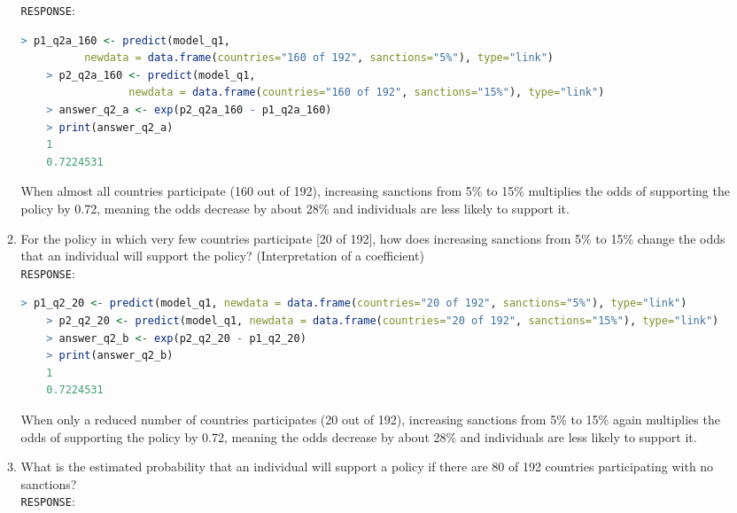 \documentclass[12pt,letterpaper]{article}
\begin{document}
\begin{enumerate}
\begin{enumerate}
\texttt{RESPONSE}:\\

\begin{lstlisting}[language=R]
	> p1_q2a_160 <- predict(model_q1,
	      newdata = data.frame(countries="160 of 192", sanctions="5%"), type="link")
	> p2_q2a_160 <- predict(model_q1,
	             newdata = data.frame(countries="160 of 192", sanctions="15%"), type="link")
	> answer_q2_a <- exp(p2_q2a_160 - p1_q2a_160)
	> print(answer_q2_a)
	1 
	0.7224531 \end{lstlisting}
\vspace{0.2in}

When almost all countries participate (160 out of 192), increasing sanctions from 5\% to 15\% multiplies the odds of supporting the policy by 0.72, meaning the odds decrease by about 28\% and individuals are less likely to support it.\\

		\item
		For the policy in which very few countries participate [20 of 192], how does increasing sanctions from 5\% to 15\% change the odds that an individual will support the policy? (Interpretation of a coefficient)\\
		
\texttt{RESPONSE}:\\

\begin{lstlisting}[language=R]
	> p1_q2_20 <- predict(model_q1, newdata = data.frame(countries="20 of 192", sanctions="5%"), type="link")
	> p2_q2_20 <- predict(model_q1, newdata = data.frame(countries="20 of 192", sanctions="15%"), type="link")
	> answer_q2_b <- exp(p2_q2_20 - p1_q2_20)
	> print(answer_q2_b)
	1 
	0.7224531  \end{lstlisting}
\vspace{0.2in}

When only a reduced number of countries participates (20 out of 192), increasing sanctions from 5\% to 15\% again multiplies the odds of supporting the policy by 0.72, meaning the odds decrease by about 28\% and individuals are less likely to support it.\\	

		\item
		What is the estimated probability that an individual will support a policy if there are 80 of 192 countries participating with no sanctions?\\
		
\texttt{RESPONSE}:\\


\end{enumerate}
\end{enumerate}
\end{document}
